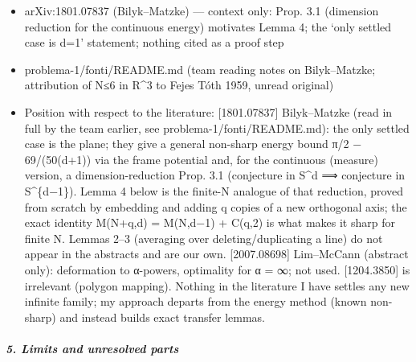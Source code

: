 \documentclass[11pt,a4paper]{article}
\providecommand{\tightlist}{\setlength{\itemsep}{0pt}\setlength{\parskip}{0pt}}
\begin{document}
\begin{itemize}
\tightlist
\item
  arXiv:1801.07837 (Bilyk--Matzke) --- context only: Prop. 3.1
  (dimension reduction for the continuous energy) motivates Lemma 4; the
  `only settled case is d=1' statement; nothing cited as a proof step
\item
  problema-1/fonti/README.md (team reading notes on Bilyk--Matzke;
  attribution of N≤6 in R\^{}3 to Fejes Tóth 1959, unread original)
\item
  Position with respect to the literature: {[}1801.07837{]}
  Bilyk--Matzke (read in full by the team earlier, see
  problema-1/fonti/README.md): the only settled case is the plane; they
  give a general non-sharp energy bound π/2 − 69/(50(d+1)) via the frame
  potential and, for the continuous (measure) version, a
  dimension-reduction Prop. 3.1 (conjecture in S\^{}d ⟹ conjecture in
  S\^{}\{d−1\}). Lemma 4 below is the finite-N analogue of that
  reduction, proved from scratch by embedding and adding q copies of a
  new orthogonal axis; the exact identity M(N+q,d) = M(N,d−1) + C(q,2)
  is what makes it sharp for finite N. Lemmas 2--3 (averaging over
  deleting/duplicating a line) do not appear in the abstracts and are
  our own. {[}2007.08698{]} Lim--McCann (abstract only): deformation to
  α-powers, optimality for α = ∞; not used. {[}1204.3850{]} is
  irrelevant (polygon mapping). Nothing in the literature I have settles
  any new infinite family; my approach departs from the energy method
  (known non-sharp) and instead builds exact transfer lemmas.
\end{itemize}

\subparagraph{5. Limits and unresolved
parts}\label{limits-and-unresolved-parts}
\end{document}

